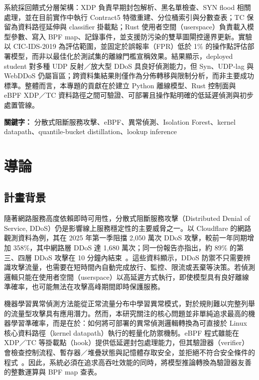 \documentclass[12pt, a4paper, fontset=none]{ctexart}
\begin{document}
系統採回饋式分層架構：XDP 負責早期封包解析、黑名單檢查、SYN flood 相關處理，並在目前實作中執行 Contract5 特徵重建、分位桶索引與分數查表；TC 保留為資料路徑延伸與 classifier 掛載點；Rust 使用者空間（userspace）負責載入模型參數、寫入 BPF map、記錄事件，並支援防污染的雙草圖閘控邊界更新。實驗以 CIC-IDS-2019 為評估範圍，並固定於誤報率（FPR）低於 1\% 的操作點評估部署模型，而非以最佳化於測試集的離線門檻宣稱效果。結果顯示，deployed student 對多種 UDP 反射／放大型 DDoS 具良好偵測能力，但 Syn、UDP-lag 與 WebDDoS 仍屬盲區；跨資料集結果則僅作為分佈轉移與限制分析，而非主要成功標準。整體而言，本專題的貢獻在於建立 Python 離線模型、Rust 控制面與 eBPF XDP／TC 資料路徑之間可驗證、可部署且操作點明確的低延遲偵測與初步處置管線。

\vspace{1em}
\noindent\textbf{關鍵字：} 分散式阻斷服務攻擊、eBPF、異常偵測、Isolation Forest、kernel datapath、quantile-bucket distillation、lookup inference

\newpage
\tableofcontents
\listoffigures
\listoftables
\newpage

\section{導論}
\label{sec:intro}

\subsection{計畫背景}
隨著網路服務高度依賴即時可用性，分散式阻斷服務攻擊（Distributed Denial of Service, DDoS）仍是影響線上服務穩定性的主要威脅之一。以 Cloudflare 的網路觀測資料為例，其在 2025 年第一季阻擋 2,050 萬次 DDoS 攻擊，較前一年同期增加 358\%，其中網路層 DDoS 達 1,680 萬次；同一份報告亦指出，約 89\% 的第三、四層 DDoS 攻擊在 10 分鐘內結束~\cite{cloudflare2025q1ddos}。這些資料顯示，DDoS 防禦不只需要辨識攻擊流量，也需要在短時間內自動完成放行、監控、限流或丟棄等決策。若偵測邏輯只能在使用者空間（userspace）以高延遲方式執行，即使模型具有良好離線準確率，也可能無法在攻擊高峰期間即時保護服務。

機器學習異常偵測方法能從正常流量分布中學習異常模式，對於規則難以完整列舉的流量型攻擊具有應用潛力。然而，本研究關注的核心問題並非單純追求最高的機器學習準確率，而是在於：如何將可部署的異常偵測邏輯轉換為可直接於 Linux 核心資料路徑（kernel datapath）執行的輕量化防禦機制。eBPF 程式雖能在 XDP／TC 等掛載點（hook）提供低延遲封包處理能力，但其驗證器（verifier）會檢查控制流程、暫存器／堆疊狀態與記憶體存取安全，並拒絕不符合安全條件的程式~\cite{linuxBpfVerifier}。因此，系統必須在追求高吞吐效能的同時，將模型推論轉換為驗證器友善的整數運算與 BPF map 查表。
\end{document}
